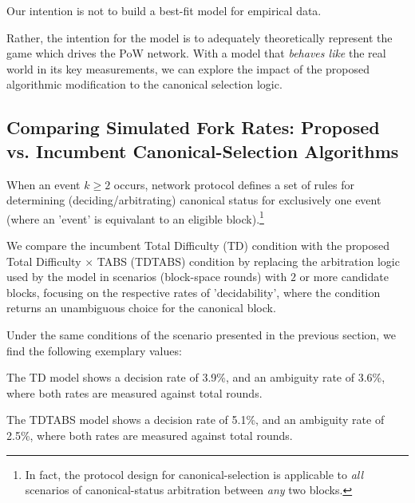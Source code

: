 \documentclass[11pt]{article}
\theoremstyle{plain}
\newcommand{\comment}[1]{}
\begin{document}
Our intention is not to build a best-fit model for empirical data.

Rather, the intention for the model is to adequately theoretically represent the game
which drives the PoW network. With a model that \emph{behaves like} the real
world in its key measurements, we can explore the impact of the proposed
algorithmic modification to the canonical selection logic.

\subsection{\normalsize{
    Comparing Simulated Fork Rates:
    Proposed vs. Incumbent Canonical-Selection Algorithms
}}

When an event $k \geq 2$ occurs, network protocol defines a set of rules for
determining (deciding/arbitrating) canonical status for exclusively one event
(where an 'event' is equivalant to an eligible block).\footnote{
  In fact, the protocol design for canonical-selection is applicable to \emph{all}
  scenarios of canonical-status arbitration between \emph{any} two blocks.
}

We compare the incumbent Total Difficulty (TD) condition with the proposed
Total Difficulty $\times$ TABS (TDTABS) condition by replacing the arbitration
logic used by the model in scenarios (block-space rounds) with $2$ or more
candidate blocks, focusing on the respective rates of 'decidability', where
the condition returns an unambiguous choice for the canonical block.

Under the same conditions of the scenario presented in the previous section,
we find the following exemplary values:




The TD model shows a decision rate of 3.9\%, and an ambiguity rate of 3.6\%,
where both rates are measured against total rounds.

The TDTABS model shows a decision rate of 5.1\%, and an ambiguity rate of 2.5\%,
where both rates are measured against total rounds.




\end{document}
